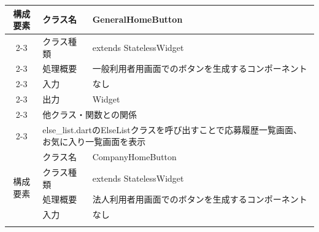 \begin{table}[H]
{\begin{tabular}{|c|l|l|}
      \multirow{7}{*}{構成要素} & クラス名                                                                                & GeneralHomeButton                                          \\ \cline{2-3}
                            & クラス種類                                                                               & extends StatelessWidget                                    \\ \cline{2-3}
                            & 処理概要                                                                                & \multicolumn{1}{p{12cm}|}{一般利用者用画面でのボタンを生成するコンポーネント}       \\ \cline{2-3}
                            & 入力                                                                                  & なし                                                         \\ \cline{2-3}
                            & 出力                                                                                  & Widget                                                     \\ \cline{2-3}
                            & \multicolumn{2}{l|}{他クラス・関数との関係}                                                                                                                 \\ \cline{2-3}
                            & \multicolumn{2}{p{14cm}|}{else\_list.dartのElseListクラスを呼び出すことで応募履歴一覧画面、お気に入り一覧画面を表示}                                                              \\
      \hline
      \multirow{7}{*}{構成要素} & クラス名                                                                                & CompanyHomeButton                                          \\ \cline{2-3}
                            & クラス種類                                                                               & extends StatelessWidget                                    \\ \cline{2-3}
                            & 処理概要                                                                                & \multicolumn{1}{p{12cm}|}{法人利用者用画面でのボタンを生成するコンポーネント}       \\ \cline{2-3}
                            & 入力                                                                                  & なし                                                         \\ \cline{2-3}

\end{tabular}}
\end{table}
